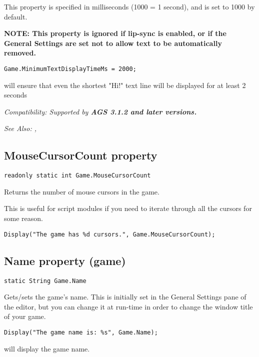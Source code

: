 This property is specified in milliseconds (1000 = 1 second), and is set to 1000 by default.

\bf{NOTE:} This property is ignored if lip-sync is enabled, or if the General Settings
are set not to allow text to be automatically removed.

\begin{verbatim}
Game.MinimumTextDisplayTimeMs = 2000;
\end{verbatim}
will ensure that even the shortest "Hi!" text line will be displayed for at least 2 seconds

\it{Compatibility:} Supported by \bf{AGS 3.1.2} and later versions.

\it{See Also:} ,


\subsection{MouseCursorCount property}\label{Game.MouseCursorCount}%

\begin{verbatim}
readonly static int Game.MouseCursorCount
\end{verbatim}
Returns the number of mouse cursors in the game.

This is useful for script modules if you need to iterate through all the cursors for some reason.

\begin{verbatim}
Display("The game has %d cursors.", Game.MouseCursorCount);
\end{verbatim}


\subsection{Name property (game)}\label{Game.Name}%

\begin{verbatim}
static String Game.Name
\end{verbatim}
Gets/sets the game's name. This is initially set in the General Settings pane of the editor,
but you can change it at run-time in order to change the window title of your game.

\begin{verbatim}
Display("The game name is: %s", Game.Name);
\end{verbatim}
will display the game name.

